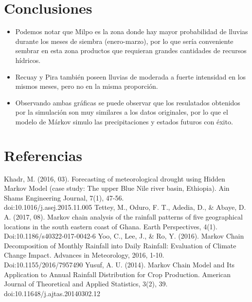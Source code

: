 \documentclass{article}
\begin{document}
\section{Conclusiones}

\begin{itemize}
    \item  Podemos notar que Milpo es la zona donde hay mayor probabilidad de lluvias durante los meses de siembra (enero-marzo), por lo que sería conveniente sembrar en esta zona productos que requieran grandes cantidades de recursos hídricos.
    \item Recuay y Pira también poseen lluvias de moderada a fuerte intensidad en los mismos meses, pero no en la misma proporción.
    \item Observando ambas gráficas se puede observar que los resulatados obtenidos por la simulación son muy similares a los datos originales, por lo que el modelo de Márkov simulo las precipitaciones y estados futuros con éxito.
\end{itemize}
\newpage
\section{Referencias}

\begingroup
\renewcommand{\section}[2]{}%

\begin{thebibliography}{..}

\bibitem{}
Khadr, M. (2016, 03). Forecasting of meteorological drought using Hidden Markov Model (case study: The upper Blue Nile river basin, Ethiopia). Ain Shams Engineering Journal, 7(1), 47-56.\\ doi:10.1016/j.asej.2015.11.005
\bibitem{}
Tettey, M., Oduro, F. T., Adedia, D., \& Abaye, D. A. (2017, 08). Markov chain analysis of the rainfall patterns of five geographical locations in the south eastern coast of Ghana. Earth Perspectives, 4(1). \\
Doi:10.1186/s40322-017-0042-6
\bibitem{}
Yoo, C., Lee, J., \& Ro, Y. (2016). Markov Chain Decomposition of Monthly Rainfall into Daily Rainfall: Evaluation of Climate Change Impact. Advances in Meteorology, 2016, 1-10.\\ Doi:10.1155/2016/7957490
\bibitem{}
Yusuf, A. U. (2014). Markov Chain Model and Its Application to Annual Rainfall Distribution for Crop Production. American Journal of Theoretical and Applied Statistics, 3(2), 39. doi:10.11648/j.ajtas.20140302.12

\end{thebibliography}

\endgroup
\end{document}
